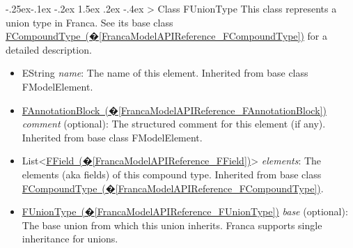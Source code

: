 \documentclass[a4paper,10pt]{scrreprt}
\makeatletter
\renewcommand\subsection{\medskip\@startsection{subsection}{2}{\z@}%
  {-.25ex\@plus -.1ex \@minus -.2ex}%
  {1.5ex \@plus .2ex \@minus -.4ex}%
  {\ifnum \scr@compatibility>\@nameuse{scr@v@2.96}\relax
    \setlength{\parfillskip}{\z@ plus 1fil}\fi
    \raggedsection\normalfont\sectfont\nobreak\size@subsection
  }%
}
\newlength{\XdocItemIndent}
\makeatother
\begin{document}
\subsection{Class FUnionType}
\label{FrancaModelAPIReference_FUnionType}
This class represents a union type in Franca. See its base class
\hyperref[FrancaModelAPIReference_FCompoundType]{FCompoundType~(�\ref*{FrancaModelAPIReference_FCompoundType})}
for a detailed description.
\setlength{\XdocItemIndent}{\textwidth}
\begin{itemize}
\addtolength{\XdocItemIndent}{-2.5em}
\item \begin{minipage}[t]{\XdocItemIndent}
EString \textit{name}: The name of this element.
		 Inherited from base class FModelElement.

\end{minipage}
\item \begin{minipage}[t]{\XdocItemIndent}
\hyperref[FrancaModelAPIReference_FAnnotationBlock]{FAnnotationBlock~(�\ref*{FrancaModelAPIReference_FAnnotationBlock})} \textit{comment} (optional): The structured comment for this element (if any).
		 Inherited from base class FModelElement.

\end{minipage}
\item \begin{minipage}[t]{\XdocItemIndent}
List<\hyperref[FrancaModelAPIReference_FField]{FField~(�\ref*{FrancaModelAPIReference_FField})}> \textit{elements}: The elements (aka fields) of this compound type.
		 Inherited from base class \hyperref[FrancaModelAPIReference_FCompoundType]{FCompoundType~(�\ref*{FrancaModelAPIReference_FCompoundType})}.

\end{minipage}
\item \begin{minipage}[t]{\XdocItemIndent}
\hyperref[FrancaModelAPIReference_FUnionType]{FUnionType~(�\ref*{FrancaModelAPIReference_FUnionType})} \textit{base} (optional): The base union from which this union inherits. Franca supports single inheritance for unions.

\end{minipage}
\end{itemize}
\addtolength{\XdocItemIndent}{2.5em}
\end{document}
